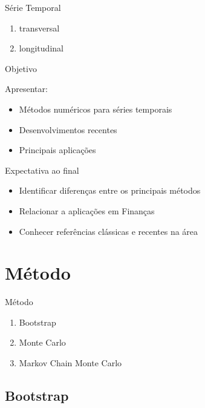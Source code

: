 \documentclass{beamer}
\begin{document}
\begin{frame}{Série Temporal}

\begin{enumerate}
\item transversal
\item longitudinal
\end{enumerate}

\end{frame}

\begin{frame}{Objetivo}

Apresentar:

\begin{itemize}
\item Métodos numéricos para séries temporais 
\item Desenvolvimentos recentes
\item Principais aplicações
\end{itemize}

\end{frame}

\begin{frame}{Expectativa ao final}

\begin{itemize}
\item Identificar diferenças entre os principais métodos
\item Relacionar a aplicações em Finanças
\item Conhecer referências clássicas e recentes na área
\end{itemize}

\end{frame}



\section{Método}


\begin{frame}{Método}

\begin{enumerate}
\item Bootstrap
\item Monte Carlo
\item Markov Chain Monte Carlo
\end{enumerate}

\end{frame}

\subsection{Bootstrap}
\end{document}
